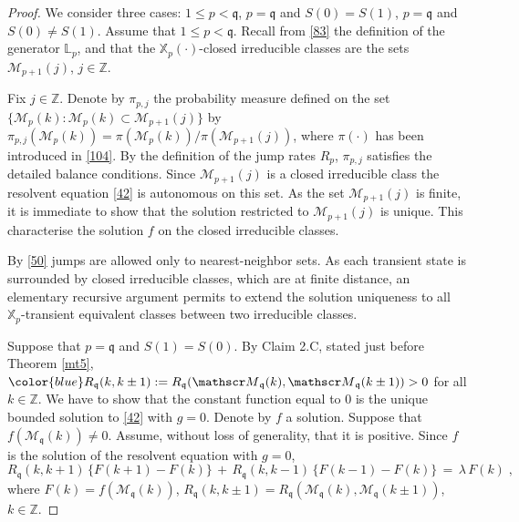 \documentclass[reqno]{amsart}
\theoremstyle{plain}
\theoremstyle{definition}
\newcommand{\mf}[1]{{\mathfrak #1}}
\newcommand{\bb}[1]{{\mathbb #1}}
\newcommand{\ms}[1]{{\mathscr #1}}
\newcounter{as}[section]
\newcommand{\<}{\langle}
\renewcommand{\>}{\rangle}
\begin{document}
\begin{proof}
We consider three cases: $1\le p<\mf q$, $p=\mf q$ and $S(0)=S(1)$,
$p=\mf q$ and $S(0)\neq S(1)$.  Assume that $1\le p<\mf q$.  Recall from
\eqref{83} the definition of the generator $\bb L_p$, and that the
$\bb X_p(\cdot)$-closed irreducible classes are the sets
$\ms M_{p+1}(j)$, $j\in \bb Z$.

Fix $j\in \bb Z$. Denote by $\pi_{p,j}$ the probability measure
defined on the set
$\{ \ms M_p(k) : \ms M_p(k) \subset \ms M_{p+1}(j)\}$ by
$\pi_{p,j} (\ms M_p(k)) = \pi(\ms M_p(k)) / \pi(\ms M_{p+1}(j))$,
where $\pi(\cdot)$ has been introduced in \eqref{104}.  By the
definition of the jump rates $R_p$, $\pi_{p,j}$ satisfies the detailed
balance conditions. Since $\ms M_{p+1}(j)$ is a closed irreducible
class the resolvent equation \eqref{42} is autonomous on this set.  As
the set $\ms M_{p+1}(j)$ is finite, it is immediate to show that the
solution restricted to $\ms M_{p+1}(j)$ is unique. This characterise
the solution $f$ on the closed irreducible classes.

By \eqref{50} jumps are allowed only to nearest-neighbor sets. As each
transient state is surrounded by closed irreducible classes, which are
at finite distance, an elementary recursive argument permits to extend
the solution uniqueness to all $\bb X_p$-transient equivalent classes
between two irreducible classes.

Suppose that $p=\mf q$ and $S(1) = S(0)$. By Claim 2.C, stated just
before Theorem \ref{mt5},
${\color{blue} R_{\mf q} (k,k\pm 1)} := R_{\mf q} (\ms M_{\mf q} (k),
\ms M_{\mf q} (k\pm 1)) > 0$ for all $k\in \bb Z$.  We have to show
that the constant function equal to $0$ is the unique bounded solution
to \eqref{42} with $g=0$. Denote by $f$ a solution. Suppose that
$f(\ms M_{\mf q} (k)) \neq 0$. Assume, without loss of generality,
that it is positive. Since $f$ is the solution of the resolvent
equation with $g=0$,
\begin{equation}
\label{105}
R_{\mf q} (k,k + 1) \, \{F(k+1) - F(k)\}
\,+\, R_{\mf q} (k,k - 1) \, \{F(k-1) - F(k)\}
\,=\, \lambda\, F(k) \;,
\end{equation}
where $F(k) = f(\ms M_{\mf q} (k))$,
$R_{\mf q} (k,k \pm 1) = R_{\mf q} (\ms M_{\mf q} (k), \ms M_{\mf q}
(k\pm 1))$, $k\in \bb Z$.


\end{proof}
\end{document}
